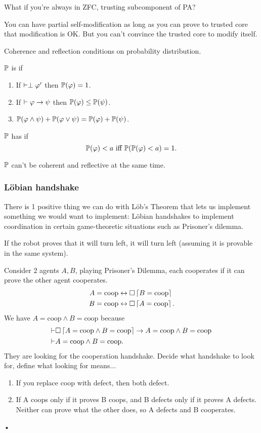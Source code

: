 \documentclass[11pt]{article}
\begin{document}

What if you're always in ZFC, trusting subcomponent of PA?

You can have partial self-modification as long as you can prove to trusted core that modification is OK. But you can't convince the trusted core to modify itself.

Coherence and reflection conditions on probability distribution.
\begin{df}
$\mathbb{P}$ is  if
\begin{enumerate}
\item
If $\vdash \perp \varphi'$ then $\mathbb{P}(\varphi)=1$. 
\item
If $\vdash \varphi\to \psi$ then $\mathbb{P}(\varphi) \le \mathbb{P}(\psi)$. 
\item
$\mathbb{P}(\varphi\wedge \psi)+ \mathbb{P}(\varphi\vee \psi) =\mathbb{P}(\varphi) + \mathbb{P}(\psi)$.
\end{enumerate}
$\mathbb{P}$ has  if
$$
\mathbb{P}(\varphi)<a \text{ iff } \mathbb{P}(\mathbb{P}(\varphi)<a)=1.
$$
\end{df}
$\mathbb{P}$ can't be coherent and reflective at the same time.

\subsubsection{L\"obian handshake}
There is 1 positive thing we can do with L\"ob's Theorem that lets us implement something we would want to implement: L\"obian handshakes to implement coordination in certain game-theoretic situations such as Prisoner's dilemma.

If the robot proves that it will turn left, it will turn left (assuming it is provable in the same system).

Consider 2 agents $A, B$, playing Prisoner's Dilemma, each cooperates if it can prove the other agent cooperates.
\begin{align}
A&=\text{coop} \leftrightarrow \square \left\lceil {B=\text{coop}}\right\rceil\\
B&=\text{coop} \leftrightarrow  \square \left\lceil {A=\text{coop}}\right\rceil.
\end{align}
We have $A=\text{coop}\wedge B=\text{coop} $ because
\begin{align}
\vdash& \square 
\left\lceil {A=\text{coop} \wedge B=\text{coop}}\right\rceil \to 
A=\text{coop}\wedge B=\text{coop}\\
\vdash &A=\text{coop}\wedge B= \text{coop}.
\end{align}
They are looking for the cooperation handshake. Decide what handshake to look for, define what looking for means...
\begin{enumerate}
\item
If you replace coop with defect, then both defect.
\item
If A coops only if it proves B coops, and B defects only if it proves A defects. Neither can prove what the other does, so A defects and B cooperates.
\end{enumerate}•
\end{document}

